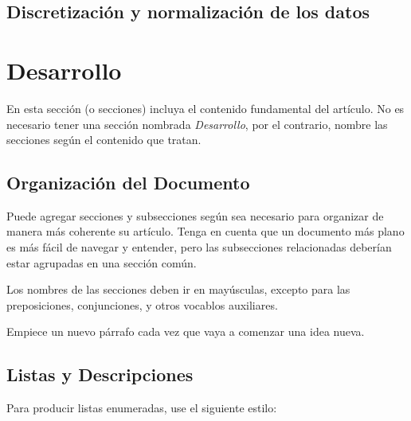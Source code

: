 \documentclass[a4paper,10pt,twocolumn]{article}
\begin{document}
\subsection{Discretización y normalización de los datos}\label{sub:discretization_and_normalization}
\paragraph{}




\section{Desarrollo}\label{sec:dev}
  En esta sección (o secciones) incluya el contenido fundamental del artículo.
  No es necesario tener una sección nombrada \emph{Desarrollo}, por el contrario,
  nombre las secciones según el contenido que tratan.

	\subsection{Organización del Documento}\label{sub:results}
		Puede agregar secciones y subsecciones según sea necesario para organizar
		de manera más coherente su artículo. Tenga en cuenta que un documento más
		plano es más fácil de navegar y entender, pero las subsecciones relacionadas
		deberían estar agrupadas en una sección común.

		Los nombres de las secciones deben ir en mayúsculas, excepto para las
		preposiciones, conjunciones, y otros vocablos auxiliares.

		Empiece un nuevo párrafo cada vez que vaya a comenzar una idea nueva.

	\subsection{Listas y Descripciones}\label{sub:lists}
		Para producir listas enumeradas, use el siguiente estilo:
\end{document}
